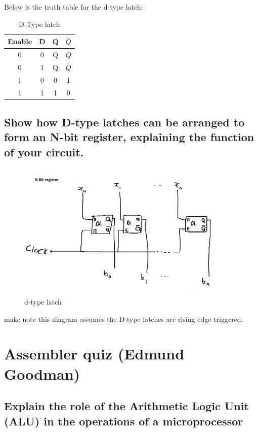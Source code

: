 \documentclass{article}
\begin{document}
Below is the truth table for the d-type latch:\newpage
\begin{table}[h]
    \centering
    \begin{tabular}{|c c|c c|}
        Enable & D & Q & $\overline{Q}$\\
        \hline
        0 & 0 & Q & $\overline{Q}$\\
        0 & 1 & Q & $\overline{Q}$\\
        1 & 0 & 0 & 1\\
        1 & 1 & 1 & 0
    \end{tabular}
    \caption{D-Type latch}
    \label{tab:my_label}
\end{table}

\subsection{Show how D-type latches can be arranged to form an N-bit register, explaining the function of your circuit.}
\begin{figure}[h]
    \centering
    \includegraphics[width=100mm]{digitalLogic7.PNG}
    \caption{d-type latch}
    \label{fig:my_label}
\end{figure}

make note this diagram assumes the D-type latches are rising edge triggered.

\newpage
\section{Assembler quiz (Edmund Goodman)}

\subsection{Explain the role of the Arithmetic Logic Unit (ALU) in the
operations of a microprocessor}
\end{document}

